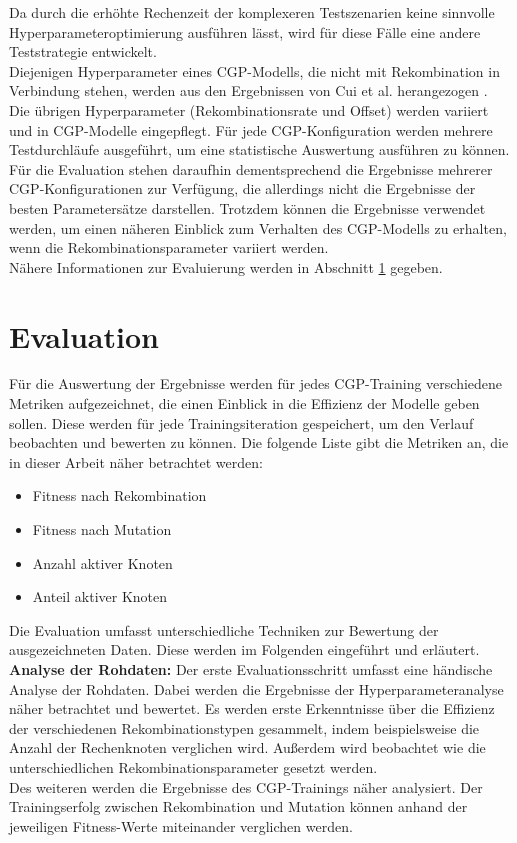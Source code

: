 Da durch die erhöhte Rechenzeit der komplexeren Testszenarien keine sinnvolle Hyperparameteroptimierung ausführen lässt, wird für diese Fälle eine andere Teststrategie entwickelt.\\
Diejenigen Hyperparameter eines CGP-Modells, die nicht mit Rekombination in Verbindung stehen, werden aus den Ergebnissen von Cui et al. herangezogen \cite{cui_results}.
Die übrigen Hyperparameter (Rekombinationsrate und Offset) werden variiert und in CGP-Modelle eingepflegt.
Für jede CGP-Konfiguration werden mehrere Testdurchläufe ausgeführt, um eine statistische Auswertung ausführen zu können.\\
Für die Evaluation stehen daraufhin dementsprechend die Ergebnisse mehrerer CGP-Kon\-fi\-gu\-ra\-tio\-nen zur Verfügung, die allerdings nicht die Ergebnisse der besten Parametersätze darstellen.
Trotzdem können die Ergebnisse verwendet werden, um einen näheren Einblick zum Verhalten des CGP-Modells zu erhalten, wenn die Rekombinationsparameter variiert werden.\\
Nähere Informationen zur Evaluierung werden in Abschnitt \ref{sec:Evaluation} gegeben.


\section{Evaluation}
\label{sec:Evaluation}

Für die Auswertung der Ergebnisse werden für jedes CGP-Training verschiedene Metriken aufgezeichnet, die einen Einblick in die Effizienz der Modelle geben sollen.
Diese werden für jede Trainingsiteration gespeichert, um den Verlauf beobachten und bewerten zu können.
Die folgende Liste gibt die Metriken an, die in dieser Arbeit näher betrachtet werden:
\begin{itemize}
	\item Fitness nach Rekombination
	\item Fitness nach Mutation
	\item Anzahl aktiver Knoten
	\item Anteil aktiver Knoten
\end{itemize}

Die Evaluation umfasst unterschiedliche Techniken zur Bewertung der ausgezeichneten Daten.
Diese werden im Folgenden eingeführt und erläutert.\\

\textbf{Analyse der Rohdaten:} Der erste Evaluationsschritt umfasst eine händische Analyse der Rohdaten.
Dabei werden die Ergebnisse der Hyperparameteranalyse näher betrachtet und bewertet.
Es werden erste Erkenntnisse über die Effizienz der verschiedenen Rekombinationstypen gesammelt, indem beispielsweise die Anzahl der Rechenknoten verglichen wird.
Außerdem wird beobachtet wie die unterschiedlichen Rekombinationsparameter gesetzt werden.\\
Des weiteren werden die Ergebnisse des CGP-Trainings näher analysiert.
Der Trainingserfolg zwischen Rekombination und Mutation können anhand der jeweiligen Fitness-Werte miteinander verglichen werden.\\

